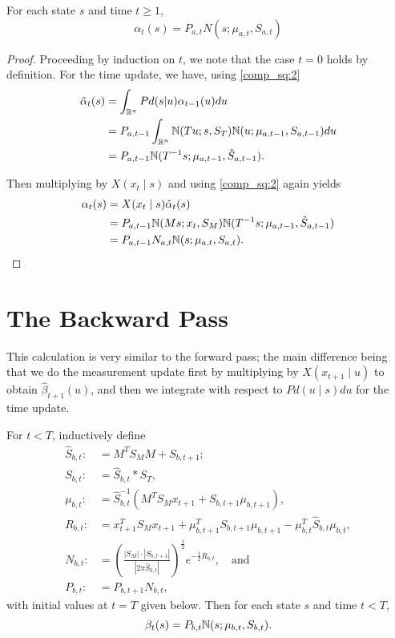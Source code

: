 \documentclass[12pt,leqno]{article}
\begin{document}
\begin{Thm}\label{alpha:1}
  For each state $s$ and time $t \ge 1$,
$$
  \alpha_t(s) = P_{a,t}N(s;\mu_{a,t},S_{a,t})
$$
\end{Thm}

\begin{proof}

Proceeding by induction on $t$, we note that the case $t = 0$ holds by definition.
For the time update, we have, using \eqref{comp_sq:2}
\begin{align}
  \hat{\alpha}_t(s) &= \int_{{\mathbb R}^n}Pd(s|u)\alpha_{t-1}(u)du \\\notag
  &= P_{a,t-1}\int_{{\mathbb R}^n}{\mathbb N}(Tu;s,S_T){\mathbb N}(u;\mu_{a,t-1},S_{a,t-1})du \notag\\
  &= P_{a,t-1}{\mathbb N}(T^{-1}s;\mu_{a,t-1},\hat{S}_{a,t-1}).
\end{align}

Then multiplying by $X(x_t\mid s)$ and using \eqref{comp_sq:2} again yields
\begin{align*}
  \alpha_t(s) &= X(x_t\mid s)\hat{\alpha}_t(s) \\
  &= P_{a,t-1}{\mathbb N}(Ms;x_t,S_M){\mathbb N}(T^{-1}s;\mu_{a,t-1},\hat{S}_{a,t-1}) \\
  &= P_{a,t-1}N_{a,t}{\mathbb N}(s;\mu_{a,t},S_{a,t}).
\end{align*}
\end{proof}

\section{The Backward Pass}
This calculation is very similar to the forward pass; the main difference being that we do
the measurement update first by multiplying by $X(x_{t+1}\mid u)$ to obtain $\hat{\beta}_{t+1}(u)$,
and then we integrate with respect to $Pd(u\mid s)du$ for the time update.  

\begin{Thm}\label{beta:1}
  For $t < T$, inductively define
\begin{align*}
  \hat{S}_{b,t} :&= M^TS_MM + S_{b,t+1};\\
  S_{b,t} :&= \hat{S}_{b,t}*S_T,\\
  \mu_{b,t} :&= \hat{S}_{b,t}^{-1}(M^TS_Mx_{t+1} + S_{b,t+1}\mu_{b,t+1}),\\
  R_{b,t} :&= x_{t+1}^TS_Mx_{t+1} + \mu_{b,t+1}^TS_{b,t+1}\mu_{b,t+1} - \mu_{b,t}^T\hat{S}_{b,t}\mu_{b,t},\\
  N_{b,t} :&= \left(\frac{|S_M|\cdot|S_{b,t+1}|}{|2\pi\hat{S}_{b,t}|}\right)^{\frac{1}{2}}e^{-\frac{1}{2}R_{b,t}},\quad\text{and}\\
  P_{b,t}:&=P_{b,t+1}N_{b,t},
\end{align*}
with initial values at $t = T$ given below. Then for each state $s$ and time $t < T$,
$$
  \beta_t(s) = P_{b,t}{\mathbb N}(s;\mu_{b,t},S_{b,t}).
$$
\end{Thm}
\end{document}
